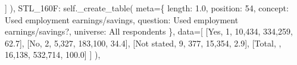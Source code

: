 \documentclass[
  11pt,
  a4paper,
]{article}
\newenvironment{Shaded}{\begin{snugshade}}{\end{snugshade}}
\newcommand{\NormalTok}[1]{\textcolor[rgb]{0.00,0.23,0.31}{#1}}
\newcommand{\OperatorTok}[1]{\textcolor[rgb]{0.37,0.37,0.37}{#1}}
\newcommand{\StringTok}[1]{\textcolor[rgb]{0.13,0.47,0.30}{#1}}
\newcommand{\VariableTok}[1]{\textcolor[rgb]{0.07,0.07,0.07}{#1}}
\begin{document}
\begin{Shaded}
\begin{Highlighting}[]
\NormalTok{                ]}
\NormalTok{            ),}
            \StringTok{\textquotesingle{}STL\_160F\textquotesingle{}}\NormalTok{: }\VariableTok{self}\NormalTok{.\_create\_table(}
\NormalTok{                meta}\OperatorTok{=}\NormalTok{\{}
                    \StringTok{\textquotesingle{}length\textquotesingle{}}\NormalTok{: }\StringTok{\textquotesingle{}1.0\textquotesingle{}}\NormalTok{, }\StringTok{\textquotesingle{}position\textquotesingle{}}\NormalTok{: }\StringTok{\textquotesingle{}54\textquotesingle{}}\NormalTok{,}
                    \StringTok{\textquotesingle{}concept\textquotesingle{}}\NormalTok{: }\StringTok{\textquotesingle{}Used employment earnings/savings\textquotesingle{}}\NormalTok{,}
                    \StringTok{\textquotesingle{}question\textquotesingle{}}\NormalTok{: }\StringTok{\textquotesingle{}Used employment earnings/savings?\textquotesingle{}}\NormalTok{,}
                    \StringTok{\textquotesingle{}universe\textquotesingle{}}\NormalTok{: }\StringTok{\textquotesingle{}All respondents\textquotesingle{}}
\NormalTok{                \},}
\NormalTok{                data}\OperatorTok{=}\NormalTok{[}
\NormalTok{                    [}\StringTok{\textquotesingle{}Yes\textquotesingle{}}\NormalTok{, }\StringTok{\textquotesingle{}1\textquotesingle{}}\NormalTok{, }\StringTok{\textquotesingle{}10,434\textquotesingle{}}\NormalTok{, }\StringTok{\textquotesingle{}334,259\textquotesingle{}}\NormalTok{, }\StringTok{\textquotesingle{}62.7\textquotesingle{}}\NormalTok{],}
\NormalTok{                    [}\StringTok{\textquotesingle{}No\textquotesingle{}}\NormalTok{, }\StringTok{\textquotesingle{}2\textquotesingle{}}\NormalTok{, }\StringTok{\textquotesingle{}5,327\textquotesingle{}}\NormalTok{, }\StringTok{\textquotesingle{}183,100\textquotesingle{}}\NormalTok{, }\StringTok{\textquotesingle{}34.4\textquotesingle{}}\NormalTok{],}
\NormalTok{                    [}\StringTok{\textquotesingle{}Not stated\textquotesingle{}}\NormalTok{, }\StringTok{\textquotesingle{}9\textquotesingle{}}\NormalTok{, }\StringTok{\textquotesingle{}377\textquotesingle{}}\NormalTok{, }\StringTok{\textquotesingle{}15,354\textquotesingle{}}\NormalTok{, }\StringTok{\textquotesingle{}2.9\textquotesingle{}}\NormalTok{],}
\NormalTok{                    [}\StringTok{\textquotesingle{}Total\textquotesingle{}}\NormalTok{, }\StringTok{\textquotesingle{}\textquotesingle{}}\NormalTok{, }\StringTok{\textquotesingle{}16,138\textquotesingle{}}\NormalTok{, }\StringTok{\textquotesingle{}532,714\textquotesingle{}}\NormalTok{, }\StringTok{\textquotesingle{}100.0\textquotesingle{}}\NormalTok{]}
\NormalTok{                ]}
\NormalTok{            ),}


\end{Highlighting}
\end{Shaded}
\end{document}
